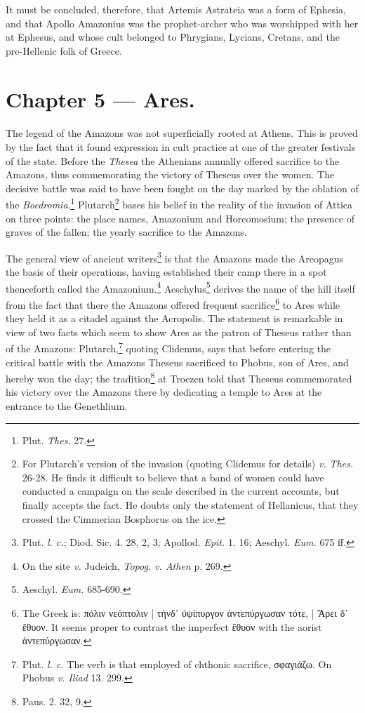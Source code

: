 \documentclass[a4paper, 12pt, oneside]{article}
\begin{document}
It must be concluded, therefore, that Artemis Astrateia was a form of Ephesia, and that Apollo Amazonius was the prophet-archer who was worshipped with her at Ephesus, and whose cult belonged to Phrygians, Lycians, Cretans, and the pre-Hellenic folk of Greece.
\clearpage
\section{Chapter 5 --- Ares.}
\paragraph{}
The legend of the Amazons was not superficially rooted at Athens. This is proved by the fact that it found expression in cult practice at one of the greater festivals of the state. Before the \emph{Thesea} the Athenians annually offered sacrifice to the Amazons, thus commemorating the victory of Theseus over the women. The decisive battle was said to have been fought on the day marked by the oblation of the \emph{Boedromia}.\footnote{Plut. \emph{Thes.} 27.} Plutarch\footnote{For Plutarch's version of the invasion (quoting Clidemus for details) \emph{v.} \emph{Thes.} 26-28. He finds it difficult to believe that a band of women could have conducted a campaign on the scale described in the current accounts, but finally accepts the fact. He doubts only the statement of Hellanicus, that they crossed the Cimmerian Bosphorus on the ice.} bases his belief in the reality of the invasion of Attica on three points: the place names, Amazonium and Horcomosium; the presence of graves of the fallen; the yearly sacrifice to the Amazons.

The general view of ancient writers\footnote{Plut. \emph{l. c.}; Diod. Sic. 4. 28, 2, 3; Apollod. \emph{Epit.} 1. 16; Aeschyl. \emph{Eum.} 675 ff.} is that the Amazons made the Areopagus the basis of their operations, having established their camp there in a spot thenceforth called the Amazonium.\footnote{On the site \emph{v.} Judeich, \emph{Topog. v. Athen} p. 269.} Aeschylus\footnote{Aeschyl. \emph{Eum.} 685-690.} derives the name of the hill itself from the fact that there the Amazons offered frequent sacrifice\footnote{The Greek is: πόλιν νεόπτολιν | τήνδ᾽ ὑψίπυργον ἀντεπύργωσαν τότε, | Ἄρει δ᾽ ἔθυον. It seems proper to contrast the imperfect ἔθυον with the aorist ἀντεπύργωσαν.} to Ares while they held it as a citadel against the Acropolis. The statement is remarkable in view of two facts which seem to show Ares as the patron of Theseus rather than of the Amazons: Plutarch,\footnote{Plut. \emph{l. c.} The verb is that employed of chthonic sacrifice, σφαγιάζω. On Phobus \emph{v.} \emph{Iliad} 13. 299.} quoting Clidemus, says that before entering the critical battle with the Amazons Theseus sacrificed to Phobus, son of Ares, and hereby won the day; the tradition\footnote{Paus. 2. 32, 9.} at Troezen told that Theseus commemorated his victory over the Amazons there by dedicating a temple to Ares at the entrance to the Genethlium.
\end{document}
